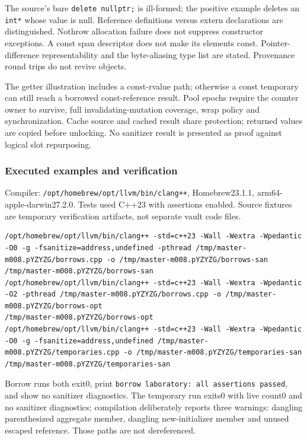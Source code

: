 \hypertarget{appendix-a103e7846d21-corrections-and-expanded-contracts}{}

The source's bare \texttt{delete\ nullptr;} is ill-formed; the positive example deletes an \texttt{int*} whose value is null. Reference definitions versus extern declarations are distinguished. Nothrow allocation failure does not suppress constructor exceptions. A const span descriptor does not make its elements const. Pointer-difference representability and the byte-aliasing type list are stated. Provenance round trips do not revive objects.

The getter illustration includes a const-rvalue path; otherwise a const temporary can still reach a borrowed const-reference result. Pool epochs require the counter owner to survive, full invalidating-mutation coverage, wrap policy and synchronization. Cache source and cached result share protection; returned values are copied before unlocking. No sanitizer result is presented as proof against logical slot repurposing.

\subsubsection{Executed examples and verification}\label{appendix-a103e7846d21-executed-examples-and-verification}

\hypertarget{appendix-a103e7846d21-executed-examples-and-verification}{}

Compiler: \texttt{/opt/homebrew/opt/llvm/bin/clang++}, Homebrew23.1.1, arm64-apple-darwin27.2.0. Tests used C++23 with assertions enabled. Source fixtures are temporary verification artifacts, not separate vault code files.

\begin{verbatim}
/opt/homebrew/opt/llvm/bin/clang++ -std=c++23 -Wall -Wextra -Wpedantic -O0 -g -fsanitize=address,undefined -pthread /tmp/master-m008.pYZYZG/borrows.cpp -o /tmp/master-m008.pYZYZG/borrows-san
/tmp/master-m008.pYZYZG/borrows-san
/opt/homebrew/opt/llvm/bin/clang++ -std=c++23 -Wall -Wextra -Wpedantic -O2 -pthread /tmp/master-m008.pYZYZG/borrows.cpp -o /tmp/master-m008.pYZYZG/borrows-opt
/tmp/master-m008.pYZYZG/borrows-opt
/opt/homebrew/opt/llvm/bin/clang++ -std=c++23 -Wall -Wextra -Wpedantic -O0 -g -fsanitize=address,undefined /tmp/master-m008.pYZYZG/temporaries.cpp -o /tmp/master-m008.pYZYZG/temporaries-san
/tmp/master-m008.pYZYZG/temporaries-san
\end{verbatim}

Borrow runs both exit0, print \texttt{borrow\ laboratory:\ all\ assertions\ passed}, and show no sanitizer diagnostics. The temporary run exits0 with live count0 and no sanitizer diagnostics; compilation deliberately reports three warnings: dangling parenthesized aggregate member, dangling new-initializer member and unused escaped reference. Those paths are not dereferenced.

